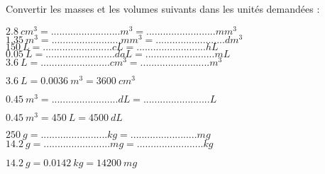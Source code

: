 
Convertir les masses et les volumes suivants dans les unités demandées :\\
\begin{questions}

		\question $ \num{2.8}\ cm^3 =  ......................... m^3 = ......................... mm^3 $\\
	
		\question $ \num{1.35}\ m^3 =  ......................... mm^3 = ......................... dm^3 $\\
		
		\question $ \num{150}\ L =  .........................  cL = ......................... hL $\\
		
		\question $ \num{0.05}\ L =  .........................  daL = ......................... mL $\\
		
	
		
		
			
	
		
		
	
			\question $ \num{3.6}\  L =  ......................... cm^3 = .........................m^3 $\\
		\begin{solution}
			$ \num{3.6}\  L =  \num{0.0036}\  m^3 = \num{3600}\  cm^3 $
		\end{solution}
	
		\question $ \num{0.45}\  m^3 =........................dL =........................L  $\\
		\begin{solution}
			$ \num{0.45}\  m^3 = \num{450}\  L = \num{4500}\  dL $
		\end{solution}
		
		
		
		\question $ \num{250}\  g =........................kg =........................mg $\\
		
		\question $\num{14.2}\  g =........................mg =........................kg $\\
		\begin{solution}
			$ \num{14.2}\  g = \num{0.0142}\  kg = \num{14200}\  mg $
		\end{solution}
		

\end{questions}
